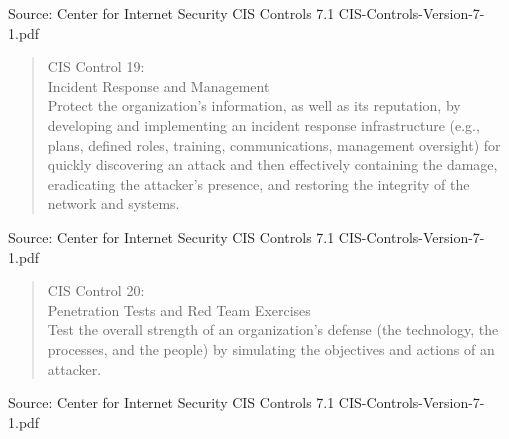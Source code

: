 \documentclass[Screen16to9,17pt]{foils}
\begin{document}
\begin{list1}
\item
\item
\item
\item
\end{list1}

Source: Center for Internet Security CIS Controls 7.1 CIS-Controls-Version-7-1.pdf


\begin{quote}
CIS Control 19:\\
Incident Response and Management\\
Protect the organization’s information, as well as its reputation, by developing and implementing an incident response infrastructure (e.g., plans, defined roles, training, communications, management oversight) for quickly discovering an attack and then effectively containing the damage, eradicating the attacker’s presence, and restoring the integrity of the network and systems.
\end{quote}

\begin{list1}
\item
\item
\item
\item
\end{list1}

Source: Center for Internet Security CIS Controls 7.1 CIS-Controls-Version-7-1.pdf


\begin{quote}
CIS Control 20:\\
Penetration Tests and Red Team Exercises\\
Test the overall strength of an organization’s defense (the technology, the processes, and the people) by simulating the objectives and actions of an attacker.
\end{quote}

\begin{list1}
\item
\item
\item
\item
\end{list1}

Source: Center for Internet Security CIS Controls 7.1 CIS-Controls-Version-7-1.pdf
\end{document}
